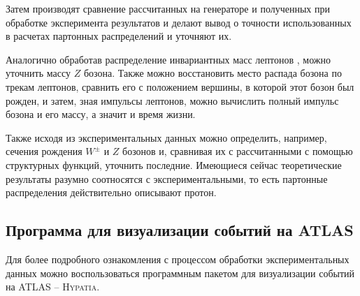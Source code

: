 \documentclass[12pt, a4paper]{article}
\begin{document}
Затем производят сравнение рассчитанных на генераторе и полученных при обработке эксперимента результатов и делают вывод о точности использованных в расчетах партонных распределений и уточняют их. 

Аналогично обработав распределение инвариантных масс лептонов \cite{pT_distributions}, можно уточнить массу $Z$ бозона. Также можно восстановить место распада бозона по трекам лептонов, сравнить его с положением вершины, в которой этот бозон был рожден, и затем, зная импульсы лептонов, можно вычислить полный импульс бозона и его массу, а значит и время жизни. 

Также исходя из экспериментальных данных можно определить, например, сечения рождения $W^\pm$ и $Z$ бозонов \cite{ellipses} и, сравнивая их с рассчитанными с помощью структурных функций, уточнить последние.
Имеющиеся сейчас теоретические результаты разумно соотносятся с экспериментальными, то есть партонные распределения действительно описывают протон.



\subsection{Программа для визуализации событий на ATLAS}
Для более подробного ознакомления с процессом обработки экспериментальных данных можно воспользоваться программным пакетом для визуализации событий на ATLAS -- \textsc{Hypatia}. 
\end{document}

